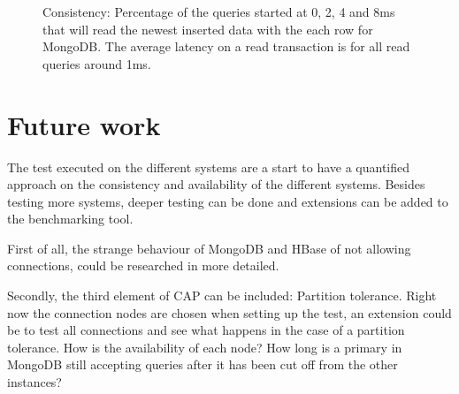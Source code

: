 \documentclass[10pt,conference,letterpaper]{IEEEtran}
\begin{document}
\begin{figure}[!htf]

\caption{Consistency: Percentage of the queries started at 0, 2, 4 and 8ms  that will read the newest inserted data with the each row for MongoDB. The average latency on a read transaction is for all read queries around 1ms. }
\label{fig:consistentie-mongodb-correct}
\end{figure}


\section{Future work}\label{sec:futurework}
The test executed on the different systems are a start to have a quantified approach on the consistency and availability of the different systems. Besides testing more systems, deeper testing can be done and extensions can be added to the benchmarking tool.

First of all, the strange behaviour of MongoDB and HBase of not allowing connections, could be researched in more detailed. 

Secondly, the third element of CAP can be included: Partition tolerance. Right now the connection nodes are chosen when setting up the test, an extension could be to test all connections and see what happens in the case of a partition tolerance. How is the availability of each node? How long is a primary in MongoDB still accepting queries after it has been cut off from the other instances? 
\end{document}
